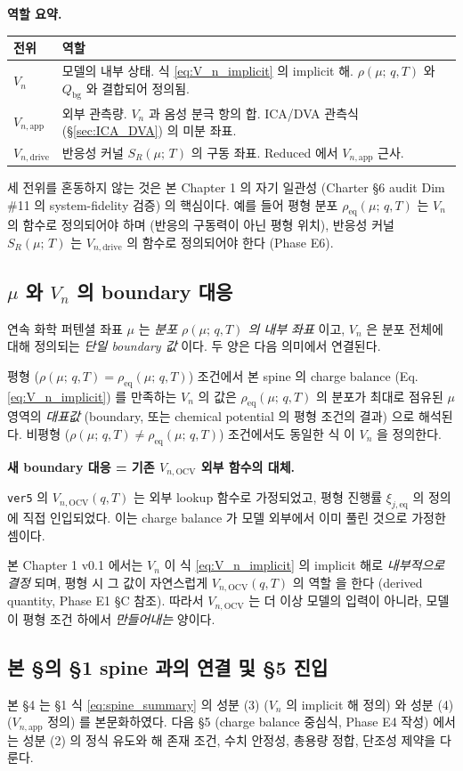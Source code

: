 \documentclass[11pt,a4paper]{article}
\newcommand{\OCV}{\mathrm{OCV}}
\newcommand{\app}{\mathrm{app}}
\newcommand{\drive}{\mathrm{drive}}
\newcommand{\eq}{\mathrm{eq}}
\newcommand{\bg}{\mathrm{bg}}
\newcommand{\mucont}{\mu}
\newcommand{\rhomu}{\rho(\mucont;\, q, T)}
\newcommand{\rhoeq}{\rho_{\eq}(\mucont;\, q, T)}
\newcommand{\Sreact}{S_R(\mucont;\, T)}
\begin{document}
\begin{mdframed}
\textbf{역할 요약.}

\begin{tabular}{p{} p{}}
\toprule
전위 & 역할 \\
\midrule
$V_n$ & 모델의 내부 상태. 식 \eqref{eq:V_n_implicit} 의 implicit 해. $\rhomu$ 와
        $Q_{\bg}$ 와 결합되어 정의됨. \\
$V_{n,\app}$ & 외부 관측량. $V_n$ 과 옴성 분극 항의 합. ICA/DVA 관측식
        (\S\ref{sec:ICA_DVA}) 의 미분 좌표. \\
$V_{n,\drive}$ & 반응성 커널 $\Sreact$ 의 구동 좌표. Reduced 에서 $V_{n,\app}$
        근사. \\
\bottomrule
\end{tabular}
\end{mdframed}

세 전위를 혼동하지 않는 것은 본 Chapter 1 의 자기 일관성 (Charter \S 6 audit
Dim \#11 의 system-fidelity 검증) 의 핵심이다. 예를 들어 평형 분포 $\rhoeq$ 는
$V_n$ 의 함수로 정의되어야 하며 (반응의 구동력이 아닌 평형 위치), 반응성 커널
$\Sreact$ 는 $V_{n,\drive}$ 의 함수로 정의되어야 한다 (Phase E6).

\subsection{$\mucont$ 와 $V_n$ 의 boundary 대응}
\label{sec:mu_V_n_correspondence}

연속 화학 퍼텐셜 좌표 $\mucont$ 는 \emph{분포 $\rhomu$ 의 내부 좌표} 이고,
$V_n$ 은 분포 전체에 대해 정의되는 \emph{단일 boundary 값} 이다. 두 양은 다음
의미에서 연결된다.

평형 ($\rhomu = \rhoeq$) 조건에서 본 spine 의 charge balance
(Eq.\,\ref{eq:V_n_implicit}) 를 만족하는 $V_n$ 의 값은 $\rhoeq$ 의 분포가 최대로
점유된 $\mucont$ 영역의 \emph{대표값} (boundary, 또는 chemical potential 의 평형
조건의 결과) 으로 해석된다. 비평형 ($\rhomu \neq \rhoeq$) 조건에서도 동일한 식
이 $V_n$ 을 정의한다.

\begin{mdframed}
\textbf{새 boundary 대응 = 기존 $V_{n,\OCV}$ 외부 함수의 대체.}

\texttt{ver5} 의 $V_{n,\OCV}(q, T)$ 는 외부 lookup 함수로 가정되었고, 평형 진행률
$\xi_{j,\eq}$ 의 정의에 직접 인입되었다. 이는 charge balance 가 모델 외부에서
이미 풀린 것으로 가정한 셈이다.

본 Chapter 1 v0.1 에서는 $V_n$ 이 식 \eqref{eq:V_n_implicit} 의 implicit 해로
\emph{내부적으로 결정} 되며, 평형 시 그 값이 자연스럽게 $V_{n,\OCV}(q, T)$ 의 역할
을 한다 (derived quantity, Phase E1 \S C 참조). 따라서 $V_{n,\OCV}$ 는 더 이상
모델의 입력이 아니라, 모델이 평형 조건 하에서 \emph{만들어내는} 양이다.
\end{mdframed}

\subsection{본 \S 의 \S 1 spine 과의 연결 및 \S 5 진입}
\label{sec:section_4_to_5_bridge}

본 \S 4 는 \S 1 식 \eqref{eq:spine_summary} 의 성분 (3) ($V_n$ 의 implicit 해 정의)
와 성분 (4) ($V_{n,\app}$ 정의) 를 본문화하였다. 다음 \S 5 (charge balance 중심식,
Phase E4 작성) 에서는 성분 (2) 의 정식 유도와 해 존재 조건, 수치 안정성, 총용량
정합, 단조성 제약을 다룬다.
\end{document}
